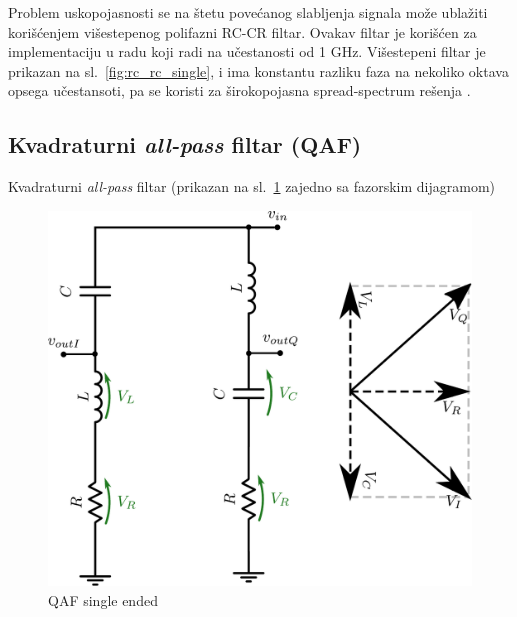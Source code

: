 \documentclass[journal,twocolumn,letterpaper]{IEEEJERM}
\begin{document}
Problem uskopojasnosti se na štetu povećanog slabljenja signala može ublažiti korišćenjem višestepenog polifazni RC-CR filtar. Ovakav filtar je korišćen za implementaciju u radu koji radi na učestanosti od 1 GHz. Višestepeni filtar je prikazan na sl.~\ref{fig:rc_rc_single}, i ima konstantu razliku faza na nekoliko oktava opsega učestansoti, pa se koristi za širokopojasna spread-spectrum rešenja \cite{chua98}.

\subsection{Kvadraturni \textit{all-pass} filtar (QAF)}

Kvadraturni \textit{all-pass} filtar (prikazan na sl.~\ref{fig:qaf_single_ended} zajedno sa fazorskim dijagramom)

\begin{figure}[!htbp]
  \centering
  \includegraphics[width=0.8\linewidth]{qaf_single_ended.pdf}
  \caption{QAF single ended}
  \label{fig:qaf_single_ended}
\end{figure}
\end{document}
